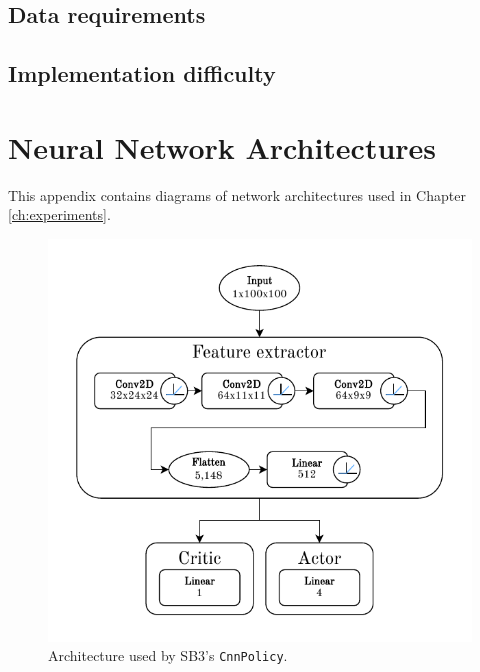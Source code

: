 \documentclass[
  digital,     %
  oneside,     %
  nosansbold,  %
  nocolorbold, %
  lof,         %
  lot,         %
]{fithesis4}
\begin{document}
\section{Data requirements}
\section{Implementation difficulty}


\printbibliography[heading=bibintoc] %


\appendix %
\chapter{Neural Network Architectures}
This appendix contains diagrams of network architectures used in Chapter \ref{ch:experiments}.

\begin{figure}
    \includegraphics[width=1\linewidth]{diagrams/cnn_arch.pdf}
    \caption{Architecture used by SB3's \texttt{CnnPolicy}.}
    \label{fig:cnn_policy}
\end{figure}
\end{document}
